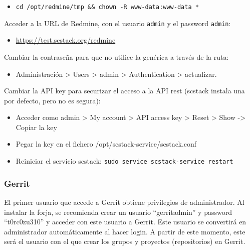 \begin{itemize}
\item
  \texttt{cd /opt/redmine/tmp \&\& chown -R www-data:www-data *}
\end{itemize}
Acceder a la URL de Redmine, con el usuario \texttt{admin} y el password
\texttt{admin}:

\begin{itemize}
\item \href{https://test.scstack.org/redmine}{https://test.scstack.org/redmine}
\end{itemize}

\par Cambiar la contraseña para que no utilice la genérica a través de la ruta:

\begin{itemize}
\item Administración \textgreater{} Users \textgreater{} admin \textgreater{} Authentication \textgreater{} actualizar.
\end{itemize}

\par Cambiar la API key para securizar el acceso a la API rest (scstack instala una por defecto, pero no es segura):

\begin{itemize}
    \item Acceder como admin \textgreater{} My account \textgreater{} API  access key \textgreater{} Reset \textgreater{} Show -\textgreater{} Copiar la key
    \item Pegar la key en el fichero /opt/scstack-service/scstack.conf
    \item Reiniciar el servicio scstack: \texttt{sudo service scstack-service restart}
\end{itemize}

\subsubsection{Gerrit}
\label{subs:conf-gerrit}

\par El primer usuario que accede a Gerrit obtiene privilegios de administrador. Al instalar la forja, se recomienda crear un usuario ``gerritadmin'' y password ``t0rc0zu310'' y acceder con este usuario a Gerrit. Este usuario se convertirá en administrador automáticamente al hacer login. A partir de este momento, este será el usuario con el que crear los grupos y proyectos (repositorios) en Gerrit.

